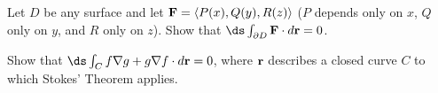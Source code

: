 \begin{enumialphparenastyle}
\begin{ex}
Let $D$ be any surface and 
let ${\bf F}=\langle P(x),Q(y),R(z)\rangle$ ($P$ depends only on $x$,
$Q$ only on $y$, and $R$ only on $z$). Show that
$\ds\int_{\partial D} {\bf F}\cdot d{\bf r}=0$.
\end{ex}

\begin{ex}
Show that $\ds\int_C f\nabla g+g\nabla f\cdot d{\bf r}=0$, where
$\bf r$ describes a closed curve $C$ to which Stokes' Theorem
applies.
\end{ex}

\end{enumialphparenastyle}